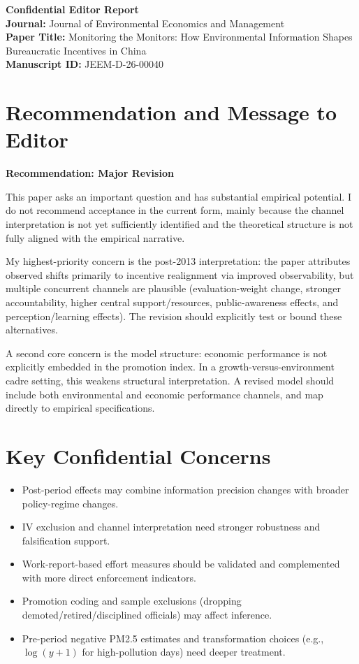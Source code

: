 \documentclass[12pt]{article}
\begin{document}
\begin{center}
    \Large \textbf{Confidential Editor Report}\\[1ex]
    \large \textbf{Journal:} Journal of Environmental Economics and Management\\
    \large \textbf{Paper Title:} Monitoring the Monitors: How Environmental Information Shapes Bureaucratic Incentives in China\\
    \large \textbf{Manuscript ID:} JEEM-D-26-00040
\end{center}

\section{Recommendation and Message to Editor}

\textbf{Recommendation: Major Revision}

This paper asks an important question and has substantial empirical potential. I do not recommend acceptance in the current form, mainly because the channel interpretation is not yet sufficiently identified and the theoretical structure is not fully aligned with the empirical narrative.

My highest-priority concern is the post-2013 interpretation: the paper attributes observed shifts primarily to incentive realignment via improved observability, but multiple concurrent channels are plausible (evaluation-weight change, stronger accountability, higher central support/resources, public-awareness effects, and perception/learning effects). The revision should explicitly test or bound these alternatives.

A second core concern is the model structure: economic performance is not explicitly embedded in the promotion index. In a growth-versus-environment cadre setting, this weakens structural interpretation. A revised model should include both environmental and economic performance channels, and map directly to empirical specifications.

\section{Key Confidential Concerns}

\begin{itemize}
    \item Post-period effects may combine information precision changes with broader policy-regime changes.
    \item IV exclusion and channel interpretation need stronger robustness and falsification support.
    \item Work-report-based effort measures should be validated and complemented with more direct enforcement indicators.
    \item Promotion coding and sample exclusions (dropping demoted/retired/disciplined officials) may affect inference.
    \item Pre-period negative PM2.5 estimates and transformation choices (e.g., $\log(y+1)$ for high-pollution days) need deeper treatment.
\end{itemize}
\end{document}
